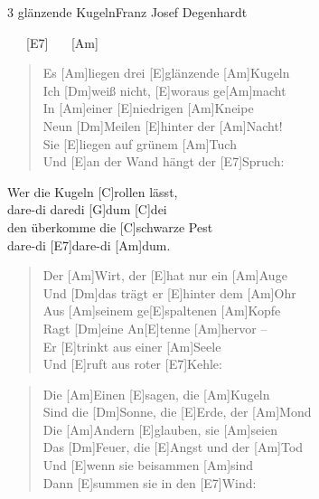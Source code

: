 \begin{song}{3 glänzende Kugeln}{Franz Josef Degenhardt}

    \begin{intro}  
        [E] \ \ \ [E7] \ \ \ [Am]
    \end{intro}  

    \begin{verse}  
        Es [Am]liegen drei [E]glänzende [Am]Kugeln \\
        Ich [Dm]weiß nicht, [E]woraus ge[Am]macht \\
        In [Am]einer [E]niedrigen [Am]Kneipe \\
        Neun [Dm]Meilen [E]hinter der [Am]Nacht! \\
        Sie [E]liegen auf grünem [Am]Tuch \\
        Und [E]an der Wand hängt der [E7]Spruch:
    \end{verse}  

    \begin{chorus}
        [F]Wer die  Kugeln [C]rollen lässt, \\
        [Dm]dare-di daredi [G]dum [C]dei \\
        [F]den überkomme die [C]schwarze Pest \\
        [E]dare-di [E7]dare-di [Am]dum.
    \end{chorus}

    \begin{verse}  
        Der [Am]Wirt, der [E]hat nur ein [Am]Auge \\
        Und [Dm]das trägt er [E]hinter dem [Am]Ohr\\
        Aus [Am]seinem ge[E]spaltenen [Am]Kopfe \\
        Ragt [Dm]eine An[E]tenne [Am]hervor – \\
        Er [E]trinkt aus einer [Am]Seele \\
        Und [E]ruft aus roter [E7]Kehle:
    \end{verse}  


    \begin{verse}  
        Die [Am]Einen [E]sagen, die [Am]Kugeln \\
        Sind die [Dm]Sonne, die [E]Erde, der [Am]Mond \\
        Die [Am]Andern [E]glauben, sie [Am]seien \\
        Das [Dm]Feuer, die [E]Angst und der [Am]Tod \\
        Und [E]wenn sie beisammen [Am]sind \\
        Dann [E]summen sie in den [E7]Wind: \\
    \end{verse}  


\end{song}
